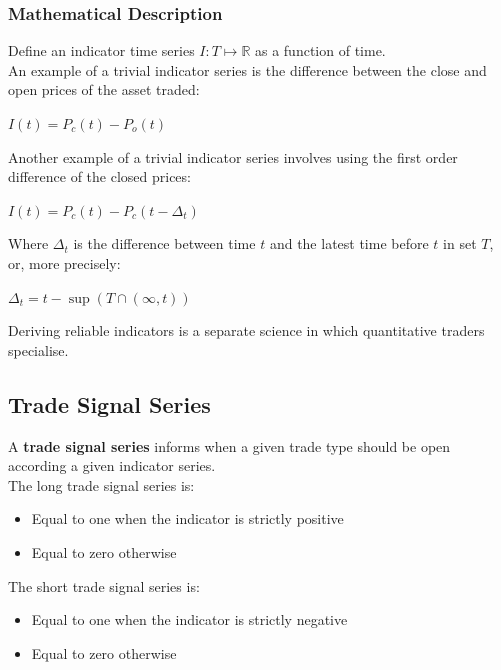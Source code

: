 \documentclass[11pt]{article}
\begin{document}
\subsubsection{Mathematical Description}


Define an indicator time series $I:T \mapsto \mathbb{R}$ as a function of time.\\

An example of a trivial indicator series is the difference between the close and open prices of the asset traded:
\begin{center}
    $I(t) = P_c(t) - P_o(t)$
\end{center}

Another example of a trivial indicator series involves using the first order difference of the closed prices:
\begin{center}
    $I(t) = P_c(t) - P_c(t - \Delta_t)$
\end{center}

Where $\Delta_t$ is the difference between time $t$ and the latest time before $t$ in set $T$, or, more precisely: 
\begin{center}
    $\Delta_t = t - \sup \left ( T \cap (\infty, t) \right )$
\end{center}

Deriving reliable indicators is a separate science in which quantitative traders specialise.

\subsection{Trade Signal Series}

A \textbf{trade signal series} informs when a given trade type should be open according a given indicator series.\\

The long trade signal series is:
\begin{itemize}
    \item Equal to one when the indicator is strictly positive
    \item Equal to zero otherwise
\end{itemize}

The short trade signal series is:
\begin{itemize}
    \item Equal to one when the indicator is strictly negative
    \item Equal to zero otherwise
\end{itemize}
\end{document}
